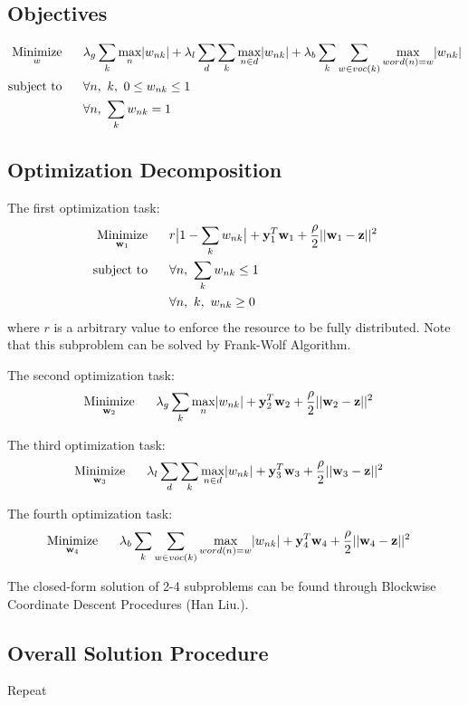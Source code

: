 \documentclass{article} %
\newcommand{\LTwoNorm}[1]{||#1||^{2}}
\newcommand{\sumk}{\sum_{k}}
\newcommand{\wnk}{w_{nk}}
\newcommand{\wone}{\mathbf{w}_1}
\newcommand{\wtwo}{\mathbf{w}_2}
\newcommand{\wthree}{\mathbf{w}_3}
\newcommand{\wfour}{\mathbf{w}_4}
\newcommand{\w}{\mathbf{w}}
\newcommand{\z}{\mathbf{z}}
\newcommand{\quadraterm}[1]{\frac{\rho}{2}\LTwoNorm{\w_{#1}-\z}}
\newcommand{\minimize}[1]{ \underset{#1}{\text{Minimize}} }
\newcommand{\subjectto}{ \text{subject to} }
\newcommand{\hs}{\hspace*{0.6cm}}
\begin{document}
\subsection{Objectives}
\begin{align}
   \minimize{w}
   \hs & \globalReg + \localReg + \coverReg \\
   \subjectto
   \hs & \forall n,\ k,\ 0 \leq  \wnk \leq 1 \\
    \hs & \forall n,\ \sumk \wnk = 1
\end{align}

 \subsection{Optimization Decomposition} \label{nseparate}

The first optimization task:
  \begin{align}
   \minimize{\wone}
   \hs & \dummyterm   %
   + \mutw{1} + \quadraterm{1} \\
   \subjectto
   \hs & \forall n,\ \sumk \wnk \leq 1 \\
   \hs & \forall n,\ k,\ \wnk \geq 0
 \end{align}
 where $r$ is a arbitrary value to enforce the resource to be fully
 distributed. Note that this subproblem can be solved by Frank-Wolf Algorithm. 

 The second optimization task:
 \begin{align} 
   \minimize{\wtwo}
   \hs & \globalReg  %
   + \mutw{2} + \quadraterm{2} 
 \end{align}

  The third optimization task:
 \begin{align} 
   \minimize{\wthree}
   \hs & \localReg  %
   + \mutw{3} + \quadraterm{3} 
 \end{align}

   The fourth optimization task:
 \begin{align} 
   \minimize{\wfour}
   \hs &  \coverReg  %
   + \mutw{4} + \quadraterm{4} 
 \end{align}

 The closed-form solution of 2-4 subproblems can be found through Blockwise
 Coordinate Descent Procedures (Han Liu.). 

\subsection{Overall Solution Procedure}
Repeat
\end{document}
